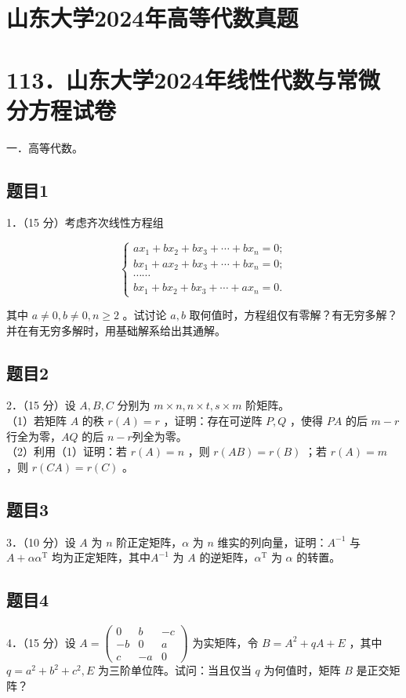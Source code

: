 \documentclass{article}
\begin{document}
\section*{山东大学2024年高等代数真题}
\section*{113．山东大学2024年线性代数与常微分方程试卷}
一．高等代数。\\

\subsection{题目1}
1．（15 分）考虑齐次线性方程组

\[
\left\{\begin{array}{c}
a x_{1}+b x_{2}+b x_{3}+\cdots+b x_{n}=0 ; \\
b x_{1}+a x_{2}+b x_{3}+\cdots+b x_{n}=0 ; \\
\cdots \cdots \\
b x_{1}+b x_{2}+b x_{3}+\cdots+a x_{n}=0 .
\end{array}\right.
\]

其中 \(a \neq 0, b \neq 0, n \geq 2\) 。试讨论 \(a, b\) 取何值时，方程组仅有零解？有无穷多解？并在有无穷多解时，用基础解系给出其通解。\\

\subsection{题目2}
2．（15 分）设 \(A, B, C\) 分别为 \(m \times n, n \times t, s \times m\) 阶矩阵。\\
（1）若矩阵 \(A\) 的秩 \(r(A)=r\) ，证明：存在可逆阵 \(P, Q\) ，使得 \(P A\) 的后 \(m-r\) 行全为零，\(A Q\) 的后 \(n-r\)列全为零。\\
（2）利用（1）证明：若 \(r(A)=n\) ，则 \(r(A B)=r(B)\) ；若 \(r(A)=m\) ，则 \(r(C A)=r(C)\) 。\\

\subsection{题目3}
3．（10 分）设 \(A\) 为 \(n\) 阶正定矩阵，\(\alpha\) 为 \(n\) 维实的列向量，证明：\(A^{-1}\) 与 \(A+\alpha \alpha^{\mathrm{T}}\) 均为正定矩阵，其中\(A^{-1}\) 为 \(A\) 的逆矩阵，\(\alpha^{\mathrm{T}}\) 为 \(\alpha\) 的转置。\\

\subsection{题目4}
4．（15 分）设 \(A=\left(\begin{array}{ccc}0 & b & -c \\ -b & 0 & a \\ c & -a & 0\end{array}\right)\) 为实矩阵，令 \(B=A^{2}+q A+E\) ，其中 \(q=a^{2}+b^{2}+c^{2}, E\) 为三阶单位阵。试问：当且仅当 \(q\) 为何值时，矩阵 \(B\) 是正交矩阵？\\
\end{document}
